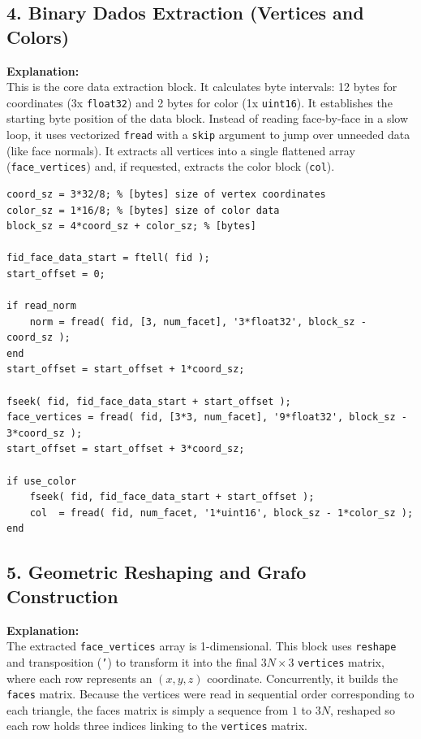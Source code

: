 \subsection{4. Binary Dados Extraction (Vertices and Colors)}
\textbf{Explanation:} \\
This is the core data extraction block. It calculates byte intervals: 12 bytes for coordinates (3x \texttt{float32}) and 2 bytes for color (1x \texttt{uint16}). It establishes the starting byte position of the data block. Instead of reading face-by-face in a slow loop, it uses vectorized \texttt{fread} with a \texttt{skip} argument to jump over unneeded data (like face normals). It extracts all vertices into a single flattened array (\texttt{face\_vertices}) and, if requested, extracts the color block (\texttt{col}).

\begin{lstlisting}
coord_sz = 3*32/8; % [bytes] size of vertex coordinates
color_sz = 1*16/8; % [bytes] size of color data
block_sz = 4*coord_sz + color_sz; % [bytes] 

fid_face_data_start = ftell( fid );
start_offset = 0;

if read_norm
	norm = fread( fid, [3, num_facet], '3*float32', block_sz - coord_sz );
end
start_offset = start_offset + 1*coord_sz;

fseek( fid, fid_face_data_start + start_offset );
face_vertices = fread( fid, [3*3, num_facet], '9*float32', block_sz - 3*coord_sz );
start_offset = start_offset + 3*coord_sz;

if use_color
	fseek( fid, fid_face_data_start + start_offset );
	col  = fread( fid, num_facet, '1*uint16', block_sz - 1*color_sz );
end
\end{lstlisting}


\subsection{5. Geometric Reshaping and Grafo Construction}
\textbf{Explanation:} \\
The extracted \texttt{face\_vertices} array is 1-dimensional. This block uses \texttt{reshape} and transposition (\texttt{'}) to transform it into the final $3N \times 3$ \texttt{vertices} matrix, where each row represents an $(x, y, z)$ coordinate. Concurrently, it builds the \texttt{faces} matrix. Because the vertices were read in sequential order corresponding to each triangle, the faces matrix is simply a sequence from $1$ to $3N$, reshaped so each row holds three indices linking to the \texttt{vertices} matrix.

